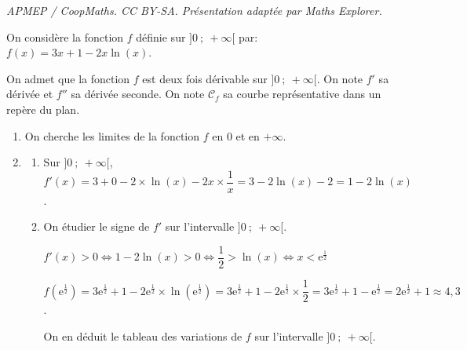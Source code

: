 \documentclass[10pt]{article}
\providecommand{\e}{{\mathrm{e}}}
\providecommand{\ds}{\displaystyle}
\begin{document}
\noindent\textit{APMEP / CoopMaths. CC BY-SA. Présentation adaptée par Maths Explorer.}\par\medskip
\medskip

On considère la fonction $f$ définie sur $]0~;~+\infty[$ par: $f(x) = 3x + 1 - 2x \ln (x)$.

On admet que la fonction $f$ est deux fois dérivable sur $]0~;~+\infty[$. 
On note $f'$ sa dérivée et $f''$ sa dérivée seconde.
On note $\mathcal{C}_f$ sa courbe représentative dans un repère du plan.



\begin{enumerate}
\item On cherche les limites de la fonction $f$ en 0 et en $+\infty$.

\item 
	\begin{enumerate}
		\item 
Sur $]0~;~+\infty[$, $f'(x)=	3+0-2\times\ln(x) -2x\times \dfrac{1}{x}=3-2\ln(x)-2 = 1-2\ln(x)$.
		
		\item On étudier le signe de $f'$  sur l'intervalle $]0~;~+\infty[$.
		


$f'(x)>0 \iff 1-2\ln(x)>0 \iff \dfrac{1}{2}>\ln(x) \iff x<\e^{\frac{1}{2}}$

$f\left (\e^{\frac{1}{2}}\right ) = 3 \e^{\frac{1}{2}} +1 -2 \e^{\frac{1}{2}} \times \ln\left (\e^{\frac{1}{2}}\right ) = 3 \e^{\frac{1}{2}} +1 -2 \e^{\frac{1}{2}} \times \dfrac{1}{2} =
3 \e^{\frac{1}{2}} +1 -  \e^{\frac{1}{2}} = 2  \e^{\frac{1}{2}} +1 \approx 4,3$.

On en déduit le tableau des variations de $f$ sur l'intervalle $]0~;~+\infty[$.


\end{enumerate}
\end{enumerate}
\end{document}
